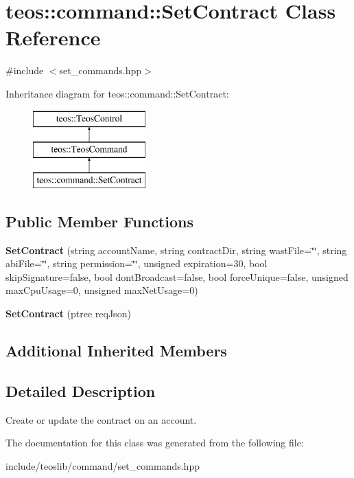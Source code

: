 \hypertarget{classteos_1_1command_1_1_set_contract}{}\section{teos\+:\+:command\+:\+:Set\+Contract Class Reference}
\label{classteos_1_1command_1_1_set_contract}


{\ttfamily \#include $<$set\+\_\+commands.\+hpp$>$}

Inheritance diagram for teos\+:\+:command\+:\+:Set\+Contract\+:\begin{figure}[H]
\begin{center}
\leavevmode
\includegraphics[height=3.000000cm]{classteos_1_1command_1_1_set_contract}
\end{center}
\end{figure}
\subsection*{Public Member Functions}
\begin{DoxyCompactItemize}
\item 
\mbox{\label{classteos_1_1command_1_1_set_contract_a1a851280aa0011a523640ea79221d095}} 
{\bfseries Set\+Contract} (string account\+Name, string contract\+Dir, string wast\+File=\char`\"{}\char`\"{}, string abi\+File=\char`\"{}\char`\"{}, string permission=\char`\"{}\char`\"{}, unsigned expiration=30, bool skip\+Signature=false, bool dont\+Broadcast=false, bool force\+Unique=false, unsigned max\+Cpu\+Usage=0, unsigned max\+Net\+Usage=0)
\item 
\mbox{\label{classteos_1_1command_1_1_set_contract_ad964aae40c3062bbb1a40fad503df852}} 
{\bfseries Set\+Contract} (ptree req\+Json)
\end{DoxyCompactItemize}
\subsection*{Additional Inherited Members}


\subsection{Detailed Description}
Create or update the contract on an account. 

The documentation for this class was generated from the following file\+:\begin{DoxyCompactItemize}
\item 
include/teoslib/command/set\+\_\+commands.\+hpp\end{DoxyCompactItemize}
